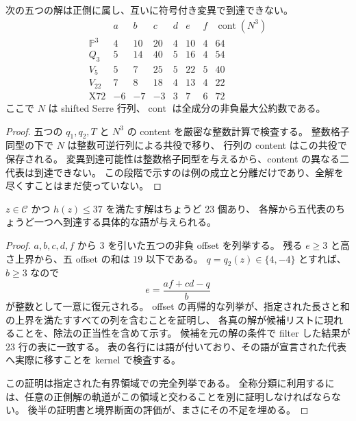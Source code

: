 \begin{proposition}[五代表と整数不変量による分離]
\label{bp:pos-representatives}
\leanok
次の五つの解は正側に属し、互いに符号付き変異で到達できない。
\[
\begin{array}{c|rrrrrr|r}
&a&b&c&d&e&f&\operatorname{cont}(N^3)\\\hline
\mathbb P^3&4&10&20&4&10&4&64\\
Q_3&5&14&40&5&16&4&54\\
V_5&5&7&25&5&22&5&40\\
V_{22}&7&8&18&4&13&4&22\\
\mathrm{X72}&-6&-7&-3&3&7&6&72
\end{array}
\]
ここで $N$ は shifted Serre 行列、$\operatorname{cont}$ は全成分の非負最大公約数である。
\end{proposition}

\begin{proof}
\leanok
五つの $q_1,q_2,T$ と $N^3$ の content を厳密な整数計算で検査する。
整数格子同型の下で $N$ は整数可逆行列による共役で移り、
行列の content はこの共役で保存される。
変異到達可能性は整数格子同型を与えるから、content の異なる二代表は到達できない。
この段階で示すのは例の成立と分離だけであり、全解を尽くすことはまだ使っていない。
\end{proof}

\begin{proposition}[高さ $37$ 以下の正の領域の完全分類]
\label{bp:pos-bounded}
\leanok
$z\in\mathcal C$ かつ $h(z)\leq37$ を満たす解はちょうど $23$ 個あり、
各解から五代表のちょうど一つへ到達する具体的な語が与えられる。
\end{proposition}

\begin{proof}
\leanok
$a,b,c,d,f$ から $3$ を引いた五つの非負 offset を列挙する。
残る $e\geq3$ と高さ上界から、五 offset の和は $19$ 以下である。
$q=q_2(z)\in\{4,-4\}$ とすれば、$b\geq3$ なので
\[
 e=\frac{af+cd-q}{b}
\]
が整数として一意に復元される。
offset の再帰的な列挙が、指定された長さと和の上界を満たすすべての列を含むことを証明し、
各真の解が候補リストに現れることを、除法の正当性を含めて示す。
候補を元の解の条件で filter した結果が $23$ 行の表に一致する。
表の各行には語が付いており、その語が宣言された代表へ実際に移すことを kernel で検査する。

この証明は指定された有界領域での完全列挙である。
全称分類に利用するには、任意の正側解の軌道がこの領域と交わることを別に証明しなければならない。
後半の証明書と境界断面の評価が、まさにその不足を埋める。
\end{proof}

